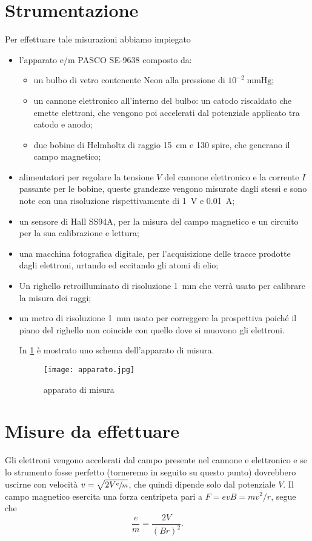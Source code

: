 \section{Strumentazione}
	Per effettuare tale misurazioni abbiamo impiegato
	\begin{itemize}
		\item l'apparato e/m PASCO SE-9638 composto da:
		\begin{itemize}
			\item un bulbo di vetro contenente Neon alla pressione di $10^{-2} \; \si{\mmHg}$;
			\item un cannone elettronico all'interno del bulbo: un catodo riscaldato che emette elettroni, che vengono poi accelerati dal potenziale applicato tra catodo e anodo;
			\item due bobine di Helmholtz di raggio \SI{15}{cm} e 130 spire, che generano il campo magnetico;
		\end{itemize}
		\item alimentatori per regolare la tensione $V$ del cannone elettronico e la corrente $I$ passante per le bobine, queste grandezze vengono misurate dagli stessi e sono note con una risoluzione rispettivamente di \SI{1}{V} e $ $\SI{0.01}{\ampere};
		\item un sensore di Hall SS94A, per la misura del campo magnetico e un circuito per la sua calibrazione e lettura;
		\item una macchina fotografica digitale, per l'acquisizione delle tracce prodotte dagli elettroni, urtando ed eccitando gli atomi di elio;
		\item Un righello retroilluminato di risoluzione \SI{1}{\mm} che verrà usato per calibrare la misura dei raggi;
		\item un metro di risoluzione \SI{1}{\mm} usato per correggere la prospettiva poiché il piano del righello non coincide con quello dove si muovono gli elettroni.

In \figurename{ \ref{apparato}} è mostrato uno schema dell'apparato di misura.

	\begin{figure}[H]
		\centering
		\texttt{[image: apparato.jpg]}
		\caption{apparato di misura}
		\label{apparato}
	\end{figure}
	
	\end{itemize}
	
\section{Misure da effettuare}
Gli elettroni vengono accelerati dal campo presente nel cannone e elettronico e se lo strumento fosse perfetto (torneremo in seguito su questo punto) dovrebbero uscirne con velocità $v = \sqrt{2V \sfrac{e}{m} }$, che quindi dipende solo dal potenziale $V$.
Il campo magnetico esercita una forza centripeta pari a $F = evB = mv^2/r$, segue che $$\frac{e}{m}=\frac{2V}{(B r)^2}.$$

